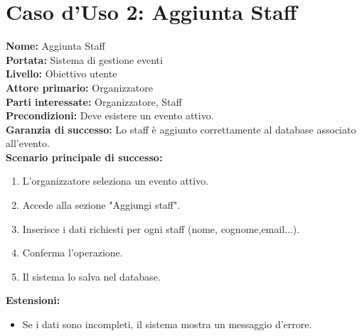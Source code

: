 \documentclass[a4paper,12pt]{article}
\begin{document}
\section*{\textcolor{sectioncolor}{Caso d'Uso 2: Aggiunta Staff}}
\textcolor{textcolor}{
\textbf{Nome:} Aggiunta Staff\\
\textbf{Portata:} Sistema di gestione eventi\\
\textbf{Livello:} Obiettivo utente\\
\textbf{Attore primario:} Organizzatore\\
\textbf{Parti interessate:} Organizzatore, Staff\\
\textbf{Precondizioni:} Deve esistere un evento attivo.\\
\textbf{Garanzia di successo:} Lo staff è aggiunto correttamente al database associato all'evento.\\
\textbf{Scenario principale di successo:}
\begin{enumerate}
    \item L'organizzatore seleziona un evento attivo.
    \item Accede alla sezione "Aggiungi staff".
    \item Inserisce i dati richiesti per ogni staff (nome, cognome,email...).
    \item Conferma l'operazione.
    \item Il sistema lo salva nel database.
\end{enumerate}
\textbf{Estensioni:}
\begin{itemize}
    \item Se i dati sono incompleti, il sistema mostra un messaggio d'errore.
\end{itemize}
}
\end{document}
